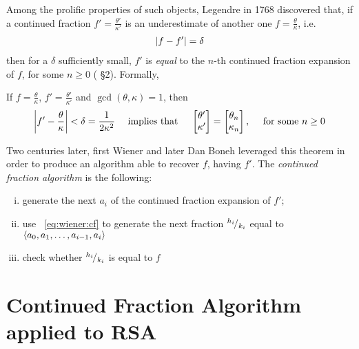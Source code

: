 Among the prolific properties of such objects, Legendre in 1768 discovered that,
if a continued fraction $f' = \frac{\theta'}{\kappa'}$ is
an underestimate of another one $f = \frac{\theta}{\kappa}$, i.e.
\begin{align}
  \left|f - f'\right| = \delta
\end{align}
then for a $\delta$ sufficiently small, $f'$ is \emph{equal} to the $n$-th
continued fraction expansion of $f$, for some $n \geq 0$ (\cite{smeets} \S 2).
Formally,

\begin{theorem*}[Legendre]
  If $f = \frac{\theta}{\kappa}$,  $f' = \frac{\theta'}{\kappa'}$ and
  $\gcd(\theta, \kappa) = 1$, then
  \begin{align}
  \label{eq:wiener:cf_approx}
    \left|f' - \frac{\theta}{\kappa}\right| < \delta = \frac{1}{2\kappa^2}
    \quad
    \text{ implies that }
    \quad
    \begin{bmatrix}
      \theta' \\ \kappa'
    \end{bmatrix}
    =
    \begin{bmatrix}
      \theta_n \\ \kappa_n
    \end{bmatrix},
    \quad
    \text{ for some } n \geq 0
  \end{align}
\end{theorem*}

Two centuries later, first Wiener \cite{wiener} and later Dan Boneh
\cite{20years} leveraged this theorem in order to produce an algorithm able to
recover $f$, having $f'$.
The \emph{continued fraction algorithm}  is the following:
\begin{enumerate}[(i)]
  \setlength{\itemsep}{1pt}
  \setlength{\parskip}{0pt}
  \setlength{\parsep}{0pt}
  \item generate the next $a_i$ of the continued fraction expansion of $f'$;
  \item use ~\ref{eq:wiener:cf} to generate the next fraction ${}^{h_i}\!/_{k_i}$
    equal to $\langle a_0, a_1, \ldots, a_{i-1}, a_i\rangle$ %
  \item check whether ${}^{h_i}\!/_{k_i}$ is equal to $f$
\end{enumerate}

\section{Continued Fraction Algorithm applied to RSA}

